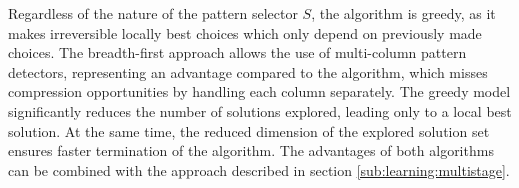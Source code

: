 Regardless of the nature of the pattern selector \(S\), the algorithm is greedy, as it makes irreversible locally best choices which only depend on previously made choices. The breadth-first approach allows the use of multi-column pattern detectors, representing an advantage compared to the  algorithm, which misses compression opportunities by handling each column separately. The greedy model significantly reduces the number of solutions explored, leading only to a local best solution. At the same time, the reduced dimension of the explored solution set ensures faster termination of the algorithm. The advantages of both algorithms can be combined with the  approach described in section \ref{sub:learning:multistage}.


